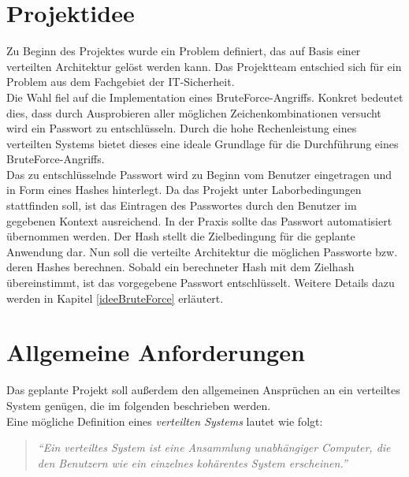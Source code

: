 \section{Projektidee}
\label{Projektidee}
Zu Beginn des Projektes wurde ein Problem definiert, das auf Basis einer verteilten Architektur gelöst werden kann. Das Projektteam entschied sich für ein Problem aus dem Fachgebiet der IT-Sicherheit.\\
Die Wahl fiel auf die Implementation eines BruteForce-Angriffs. Konkret bedeutet dies, dass durch Ausprobieren aller möglichen Zeichenkombinationen versucht wird ein Passwort zu entschlüsseln. Durch die hohe Rechenleistung eines verteilten Systems bietet dieses eine ideale Grundlage für die Durchführung eines BruteForce-Angriffs.\\
 Das zu entschlüsselnde Passwort wird zu Beginn vom Benutzer eingetragen und in Form eines Hashes hinterlegt. Da das Projekt unter Laborbedingungen stattfinden soll, ist das Eintragen des Passwortes durch den Benutzer im gegebenen Kontext ausreichend. In der Praxis sollte das Passwort automatisiert übernommen werden. 
 Der Hash stellt die Zielbedingung für die geplante Anwendung dar. Nun soll die verteilte Architektur die möglichen Passworte bzw. deren Hashes berechnen. Sobald ein berechneter Hash mit dem Zielhash übereinstimmt, ist das vorgegebene Passwort entschlüsselt. Weitere Details dazu werden in Kapitel \ref{ideeBruteForce} erläutert. \\
 


\section{Allgemeine Anforderungen}
\label{allgemeineAnforderungen}
Das geplante Projekt soll außerdem den allgemeinen Ansprüchen an ein verteiltes System genügen, die im folgenden beschrieben werden. \\
Eine mögliche Definition eines \emph{verteilten Systems} lautet wie folgt:
\begin{quotation}
	\textit{\enquote{Ein verteiltes System ist eine Ansammlung unabhängiger Computer, die den Benutzern wie ein einzelnes kohärentes System erscheinen.}} \citep{tanenbaum}
\end{quotation}

